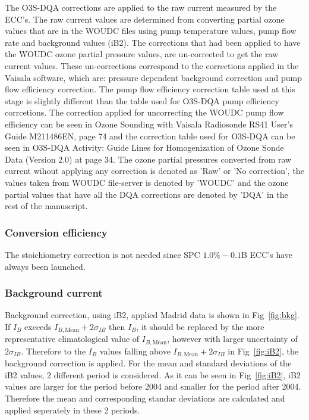 The O3S-DQA corrections are applied to the raw current measured by the ECC's. The raw current values are determined from converting partial ozone values that are
in the WOUDC files using pump temperature
values, pump flow rate and background values (iB2). The corrections that had been applied to have the WOUDC ozone partial pressure values, are un-corrected to
get the raw current values. These un-corrections correspond to the corrections applied in the Vaisala software, which are:
pressure dependent background correction and pump flow
efficiency correction. The pump flow efficiency correction table used at this stage is slightly different than the table used
for O3S-DQA pump efficiency corrcetions.
The correction applied for uncorrecting the WOUDC pump flow efficiency can be seen in Ozone Sounding with Vaisala
Radiosonde RS41 User's Guide M211486EN, page 74 and the correction table
used for O3S-DQA can be seen in O3S-DQA Activity: Guide Lines for Homogenization of Ozone Sonde Data (Version 2.0)
at page 34. The ozone partial pressures converted from raw current
wihout applying any correction is denoted as 'Raw' or 'No correction', the values taken from WOUDC file-server is denoted
by 'WOUDC' and the ozone partial values that have all the DQA corrections
are denoted by 'DQA' in the rest of the manuscript.


    \subsubsection{Conversion efficiency}
 The stoichiometry correction is not needed since SPC $1.0\%-0.1$B ECC's have always been launched.



        \subsubsection{Background current}
        Background correction, using iB2, applied Madrid data is shown in Fig~\ref{fig:bkg}. If $I_B$ exceeds $I_{B,\text{Mean}}+2\sigma_{IB}$ then $I_B$, it
should be replaced by the more representative climatological value of $I_{B,\text{Mean}}$, however with
larger uncertainty of $2\sigma_{IB}$.
Therefore to the $I_B$ values falling above $I_{B,\text{Mean}}+2\sigma_{IB}$ in Fig~\ref{fig:iB2}, the background correction is applied. For the mean and standard deviations
of the iB2 values, 2 different period is considered. As it can be seen in Fig~\ref{fig:iB2}, iB2 values are larger for the period before 2004 and smaller for the period after
2004. Therefore the mean and corresponding standar deviations are calculated and applied seperately in these 2 periods.



